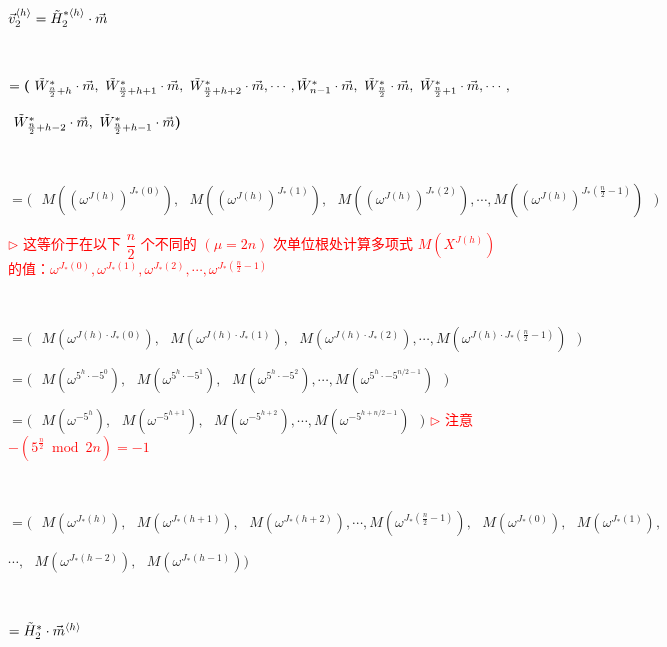 $\vec{v}_2^{\langle h \rangle} =\tilde{H}_2^{*\langle h \rangle}\cdot \vec{m}$

$ $


$ = \bm{(} \text{ } \tilde{W}^*_{\frac{n}{2} +h}\cdot\vec{m}, \text{ } \tilde{W}^*_{\frac{n}{2} + h+1}\cdot\vec{m}, \text{ } \tilde{W}^*_{\frac{n}{2} +h+2}\cdot\vec{m}, \cdots, \tilde{W}^*_{n -1}\cdot\vec{m}, \text{ } \tilde{W}^*_{\frac{n}{2}}\cdot\vec{m}, \text{ }\tilde{W}^*_{\frac{n}{2} + 1}\cdot\vec{m}, \cdots,$

\text{ }\text{ }\text{ }\text{ }$ \text{ } \tilde{W}^*_{\frac{n}{2} + h-2}\cdot\vec{m}, \text{ } \tilde{W}^*_{\frac{n}{2} + h-1}\cdot\vec{m}  \bm{)}$

$ $

$= \bm{(} \text{ } M((\omega^{J(h)})^{J_*(0)}), \text{ } M((\omega^{J(h)})^{J_*(1)}), \text{ } M((\omega^{J(h)})^{J_*(2)}), \cdots, M((\omega^{J(h)})^{J_*(\frac{n}{2}-1)}) \text{ } \bm{)}$


\textcolor{red}{ $\rhd$ 这等价于在以下 $\dfrac{n}{2}$ 个不同的 $(\mu=2n)$ 次单位根处计算多项式 $M(X^{J(h)})$ 的值：$\omega^{J_*(0)}, \omega^{J_*(1)},  \omega^{J_*(2)}, \cdots, \omega^{J_*(\frac{n}{2} - 1)}$}

$ $

$= \bm{(} \text{ } M(\omega^{J(h)\cdot J_*(0)}), \text{ } M(\omega^{J(h)\cdot J_*(1)}), \text{ } M(\omega^{J(h)\cdot J_*(2)}), \cdots, M(\omega^{J(h)\cdot J_*(\frac{n}{2}-1)}) \text{ } \bm{)}$

$= \bm{(} \text{ } M(\omega^{5^h\cdot -5^0}), \text{ } M(\omega^{5^h\cdot -5^1}), \text{ } M(\omega^{5^h\cdot -5^2}), \cdots, M(\omega^{5^h\cdot -5^{n/2-1}}) \text{ } \bm{)}$

$= \bm{(} \text{ } M(\omega^{-5^{h}}), \text{ } M(\omega^{-5^{h+1}}), \text{ } M(\omega^{-5^{h+2}}), \cdots, M(\omega^{-5^{h+n/2-1}}) \text{ } \bm{)}$ \textcolor{red}{ $\rhd$ 注意 $-(5^{\frac{n}{2}} \bmod 2n) = -1$}

$ $

$= \bm{(} \text{ } M(\omega^{J_*(h)}), \text{ } M(\omega^{J_*(h+1)}), \text{ } M(\omega^{J_*(h+2)}), \cdots, M(\omega^{J_*(\frac{n}{2}-1)}), \text{ } M(\omega^{J_*(0)}), \text{ }M(\omega^{J_*(1)}),$ 
                                    
$\cdots, \text{ } M(\omega^{J_*(h-2)}), \text{ } M(\omega^{J_*(h-1)})  \bm{)}$ 

$ $

$= \tilde{H}_2^{*}\cdot \vec{m}^{\langle h \rangle}$


$ $

